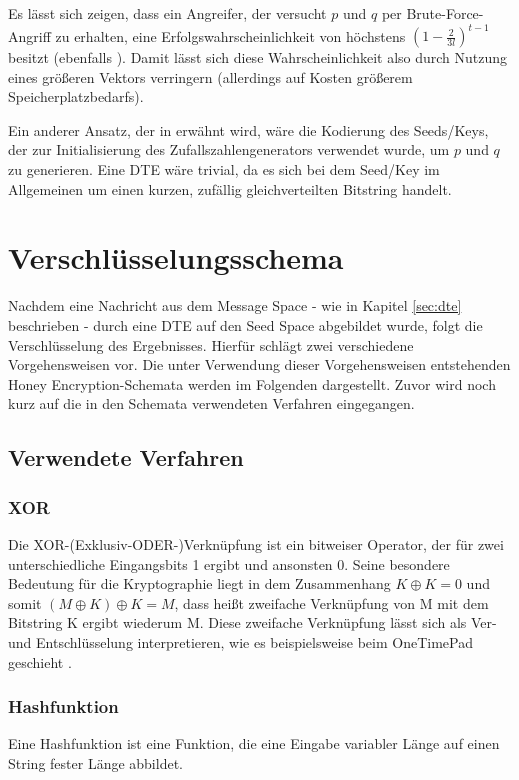 Es lässt sich zeigen, dass ein Angreifer, der versucht \(p\) und \(q\) per Brute-Force-Angriff zu erhalten, eine  Erfolgswahrscheinlichkeit von höchstens \((1-\frac{2}{3l})^{t-1}\) besitzt (ebenfalls \cite{EURO2014}). Damit lässt sich diese Wahrscheinlichkeit also durch Nutzung eines größeren Vektors verringern (allerdings auf Kosten größerem Speicherplatzbedarfs).

Ein anderer Ansatz, der in \cite{EURO2014} erwähnt wird, wäre die Kodierung des Seeds/Keys, der zur Initialisierung des Zufallszahlengenerators verwendet wurde, um \(p\) und \(q\) zu generieren. Eine DTE wäre trivial, da es sich bei dem Seed/Key im Allgemeinen um einen kurzen, zufällig gleichverteilten Bitstring handelt. 

\section{Verschlüsselungsschema}
\label{sec:schema}

Nachdem eine Nachricht aus dem Message Space - wie in Kapitel \ref{sec:dte} beschrieben - durch eine DTE auf den Seed Space abgebildet wurde, folgt die Verschlüsselung des Ergebnisses. Hierfür schlägt \cite{EURO2014} zwei verschiedene Vorgehensweisen vor. Die unter Verwendung dieser Vorgehensweisen entstehenden Honey Encryption-Schemata werden im Folgenden dargestellt. Zuvor wird noch kurz auf die in den Schemata verwendeten Verfahren eingegangen.

\subsection{Verwendete Verfahren}

\subsubsection*{XOR}
Die XOR-(Exklusiv-ODER-)Verknüpfung ist ein bitweiser Operator, der für zwei unterschiedliche Eingangsbits 1 ergibt und ansonsten 0. Seine besondere Bedeutung für die Kryptographie liegt in dem Zusammenhang \(K \oplus K = 0\) und somit \((M \oplus K) \oplus K = M\), dass heißt zweifache Verknüpfung von M mit dem Bitstring K ergibt wiederum M. Diese zweifache Verknüpfung lässt sich als Ver- und Entschlüsselung interpretieren, wie es beispielsweise beim OneTimePad geschieht \cite{Schneier2006}.%

\subsubsection*{Hashfunktion}
Eine Hashfunktion ist eine Funktion, die eine Eingabe variabler Länge auf einen String fester Länge abbildet.

